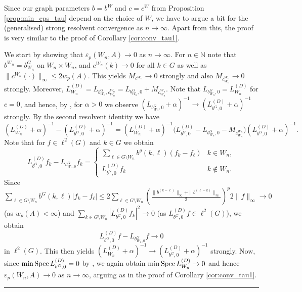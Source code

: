 \documentclass{article}
\newcommand\N{{\mathbb N}}
\newcommand\eps{{\varepsilon}}
\newcommand\Spec{{\rm Spec}\,}  %
\newcommand\Proofend{\rule{2mm}{2mm}}
\renewenvironment{proof}
 {\par\noindent{\bf Proof.}}
 {\Proofend\par\pagebreak[2]}
\numberwithin{equation}{section}   %
\numberwithin{figure}{section}  %
\begin{document}
Since our graph parameters $b=b^W$ and $c=c^W$ from Proposition \ref{prop:min_eps_tau} depend on the choice of $W$, we have to argue a bit for the (generalised) strong resolvent convergence as $n\to \infty$. Apart from this, the proof is very similar to the proof of Corollary \ref{cor:conv_tau1}.

\begin{proof}
We start by showing that $\eps_p(W_n,A)\to 0$ as $n\to\infty$.
For $n\in\N$ note that $b^{W_n} = b^G_{W_n}$ on $W_n\times W_n$, and $c^{W_n}(k)\to 0$ for all $k\in G$ as well as $\|c^{W_n}(\cdot)\|_\infty \leq 2w_p(A)$. This yields $M_{c^{W_n}}\to 0$ strongly and also $M_{c^{W_n}_{W_n}}\to 0$ strongly.
Moreover, $L_{W_n}^{(D)} = L_{b^G_{W_n},c^{W_n}_{W_n}} = L_{b^G_{W_n},0} + M_{c^{W_n}_{W_n}}$. Note that $L_{b^G_{W_n},0} = L_{W_n}^{(D)}$ for $c=0$, and hence,
by \cite[Lemma 1.21]{KellerLenzWojciechowskiBook}, for $\alpha>0$ we observe $(L_{b^G_{W_n},0}+\alpha)^{-1}\to (L_{b^G,0}^{(D)}+\alpha)^{-1}$ strongly. By the second resolvent identity we have
\[(L_{W_n}^{(D)}+\alpha)^{-1} - (L_{b^G,0}^{(D)}+\alpha)^{-1} = (L_{W_n}^{(D)}+\alpha)^{-1}\bigl(L_{b^G,0}^{(D)} - L_{b^G_{W_n},0} - M_{c^{W_n}_{W_n}}\bigr) (L_{b^G,0}^{(D)}+\alpha)^{-1}.\]
Note that for $f\in \ell^2(G)$ and $k\in G$ we obtain
\[L_{b^G,0}^{(D)} f_k - L_{b^G_{W_n,0}} f_k = \begin{cases} \sum_{\ell\in G\setminus W_n} b^g(k,\ell)(f_k-f_\ell) & k\in W_n,\\
L_{b^G,0}^{(D)} f_k & k\notin W_n.
\end{cases}\]
Since $\sum_{\ell\in G\setminus W_n}b^G(k,\ell)|f_k-f_\ell| \leq 2\sum_{\ell\in G\setminus W_n} \left(\frac{\|b^{(k-\ell)}\|_\infty + \|b^{(\ell-k)}\|_\infty}{2}\right)^p 2\|f\|_\infty \to 0$ (as $w_p(A)<\infty$) and $\sum_{k\in G\setminus W_n} |L_{b^G,0}^{(D)} f_k|^2 \to 0$ (as $L_{b^G,0}^{(D)} f\in \ell^2(G)$), we obtain
\[L_{b^G,0}^{(D)} f - L_{b^G_{W_n,0}} f \to 0\]
in $\ell^2(G)$.
This then yields $(L_{W_n}^{(D)}+\alpha)^{-1} \to (L_{b^G,0}^{(D)}+\alpha)^{-1}$ strongly.
Now, since $\min\Spec L_{b^G,0}^{(D)} = 0$ by \cite[Theorem 13.8]{KellerLenzWojciechowskiBook}, we again obtain $\min\Spec L_{W_n}^{(D)}\to 0$ and hence $\eps_p(W_n,A)\to 0$ as $n\to\infty$, arguing as in the proof of Corollary \ref{cor:conv_tau1}.


\end{proof}
\end{document}
